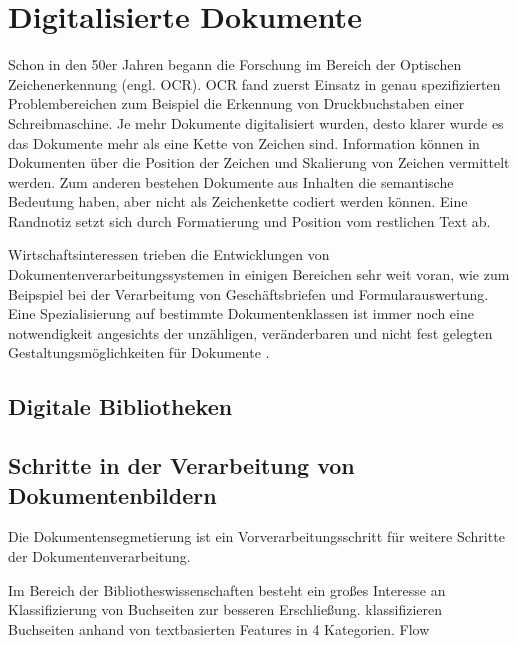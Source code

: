 \chapter{Digitalisierte Dokumente}
\label{chap:documents}


% 
Schon in den 50er Jahren begann die Forschung im Bereich der Optischen Zeichenerkennung 
(engl. OCR)\autocite{DoermannHandbookdocumentimage2014}. OCR fand zuerst Einsatz in genau 
spezifizierten Problembereichen zum Beispiel die Erkennung von Druckbuchstaben einer Schreibmaschine. 
Je mehr Dokumente digitalisiert wurden, desto klarer wurde es das Dokumente mehr als 
eine Kette von Zeichen sind. 
Information können in Dokumenten über die Position der Zeichen und Skalierung von Zeichen vermittelt werden.
Zum anderen bestehen Dokumente aus Inhalten die semantische Bedeutung haben, aber nicht als Zeichenkette codiert werden können. 
Eine Randnotiz setzt sich durch Formatierung und Position vom restlichen Text ab. 

Wirtschaftsinteressen trieben die Entwicklungen von Dokumentenverarbeitungssystemen in einigen Bereichen sehr weit voran, wie 
zum Beipspiel bei der Verarbeitung von Geschäftsbriefen und Formularauswertung.
Eine Spezialisierung auf bestimmte Dokumentenklassen ist immer noch eine notwendigkeit angesichts der unzähligen, veränderbaren und nicht fest gelegten Gestaltungsmöglichkeiten für Dokumente \autocite[69]{BairdEvolutionDocumentImage2014}.


\section{Digitale Bibliotheken}
\cite{BairdDigitallibrariesdocument2003}

\section{Schritte in der Verarbeitung von Dokumentenbildern}
Die Dokumentensegmetierung ist ein Vorverarbeitungsschritt für weitere Schritte der Dokumentenverarbeitung.

Im Bereich der Bibliotheswissenschaften besteht ein großes Interesse an Klassifizierung von
Buchseiten zur besseren Erschließung.
\cite{McConnaugheyLabeledSegmentationPrinted2017} klassifizieren Buchseiten anhand von textbasierten Features in 4 Kategorien. 
Flow


